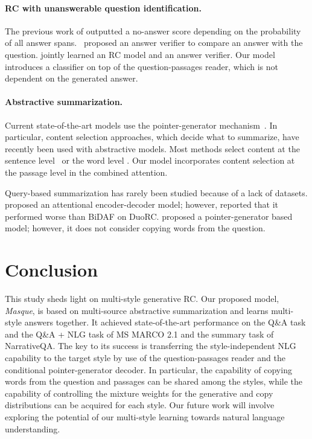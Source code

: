 \documentclass[11pt,a4paper]{article}
\theoremstyle{mydef}
\theoremstyle{myprob}
\begin{document}
\paragraph{RC with unanswerable question identification.}

The previous work of \citep{LevySCZ17,GardnerC18} outputted a no-answer score depending on the probability of all answer spans. \citet{HuWPHYZ18}~proposed an answer verifier to compare an answer with the question. \citet{SunLQL18} 
jointly learned an RC model and an answer verifier. Our model introduces a classifier on top of the question-passages reader, which is not dependent on the generated answer. 
\paragraph{Abstractive summarization.}

Current state-of-the-art models use the pointer-generator mechanism~\citep{SeeLM17}.
In particular, content selection approaches, which decide what to summarize, have recently been used with abstractive models. Most methods select content at the sentence level~\citep{HsuLLMTS18,ChenB18} or the word level \citep{PasunuruB18,LiXLG18,GehrmannDR18}. Our model incorporates content selection at the passage level in the combined attention. 

Query-based 
summarization has rarely been studied because of a lack of datasets. \citet{NemaKLR17} proposed an attentional encoder-decoder model; however, \citet{KhapraSSA18} reported that it performed worse than BiDAF on DuoRC.
\citet{HasselqvistHK17} proposed a pointer-generator based model; however, it does not consider copying words from the question. %

\section{Conclusion}

This study sheds light on multi-style generative RC.
Our proposed model, \textit{Masque}, is based on multi-source abstractive summarization
and learns multi-style answers together.
It achieved state-of-the-art performance on 
the Q\&A task and the Q\&A + NLG task of
MS MARCO 2.1 and the summary task of NarrativeQA.
The key to its success is transferring the style-independent NLG capability to the target style 
by use of
the question-passages reader and the conditional pointer-generator decoder.
In particular, the capability of copying words from the question and passages can be shared among the styles, 
while the capability of controlling the mixture weights for the generative and copy distributions can be acquired for each style. 
Our future work will involve exploring the potential of our multi-style learning towards natural language understanding.
\end{document}
